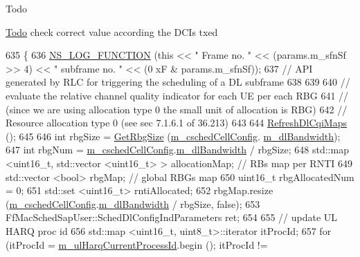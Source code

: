 \begin{DoxyRefDesc}{Todo}
\item[\hyperlink{todo__todo000136}{Todo}]check correct value according the D\+C\+Is txed \end{DoxyRefDesc}

\begin{DoxyCode}
635 \{
636   \hyperlink{log-macros-disabled_8h_a90b90d5bad1f39cb1b64923ea94c0761}{NS\_LOG\_FUNCTION} (\textcolor{keyword}{this} << \textcolor{stringliteral}{" Frame no. "} << (params.m\_sfnSf >> 4) << \textcolor{stringliteral}{" subframe no. "} << (0
      xF & params.m\_sfnSf));
637   \textcolor{comment}{// API generated by RLC for triggering the scheduling of a DL subframe}
638 
639 
640   \textcolor{comment}{// evaluate the relative channel quality indicator for each UE per each RBG}
641   \textcolor{comment}{// (since we are using allocation type 0 the small unit of allocation is RBG)}
642   \textcolor{comment}{// Resource allocation type 0 (see sec 7.1.6.1 of 36.213)}
643 
644   \hyperlink{classns3_1_1TdMtFfMacScheduler_a79d3716344b1b545a4b2a4093bcde846}{RefreshDlCqiMaps} ();
645 
646   \textcolor{keywordtype}{int} rbgSize = \hyperlink{classns3_1_1TdMtFfMacScheduler_a5bf2037886b14b424e6511e164b410b4}{GetRbgSize} (\hyperlink{classns3_1_1TdMtFfMacScheduler_a585412f686e33f49dad1003e5d2216f0}{m\_cschedCellConfig}.
      \hyperlink{structns3_1_1FfMacCschedSapProvider_1_1CschedCellConfigReqParameters_ad18c695bd3c9d7f742ba1dab4a941e8a}{m\_dlBandwidth});
647   \textcolor{keywordtype}{int} rbgNum = \hyperlink{classns3_1_1TdMtFfMacScheduler_a585412f686e33f49dad1003e5d2216f0}{m\_cschedCellConfig}.\hyperlink{structns3_1_1FfMacCschedSapProvider_1_1CschedCellConfigReqParameters_ad18c695bd3c9d7f742ba1dab4a941e8a}{m\_dlBandwidth} / rbgSize;
648   std::map <uint16\_t, std::vector <uint16\_t> > allocationMap; \textcolor{comment}{// RBs map per RNTI}
649   std::vector <bool> rbgMap;  \textcolor{comment}{// global RBGs map}
650   uint16\_t rbgAllocatedNum = 0;
651   std::set <uint16\_t> rntiAllocated;
652   rbgMap.resize (\hyperlink{classns3_1_1TdMtFfMacScheduler_a585412f686e33f49dad1003e5d2216f0}{m\_cschedCellConfig}.\hyperlink{structns3_1_1FfMacCschedSapProvider_1_1CschedCellConfigReqParameters_ad18c695bd3c9d7f742ba1dab4a941e8a}{m\_dlBandwidth} / rbgSize, \textcolor{keyword}{false});
653   FfMacSchedSapUser::SchedDlConfigIndParameters ret;
654 
655   \textcolor{comment}{//   update UL HARQ proc id}
656   std::map <uint16\_t, uint8\_t>::iterator itProcId;
657   \textcolor{keywordflow}{for} (itProcId = \hyperlink{classns3_1_1TdMtFfMacScheduler_a01393611d03f7107ec6c0a0db95858c2}{m\_ulHarqCurrentProcessId}.begin (); itProcId != 

\end{DoxyCode}
